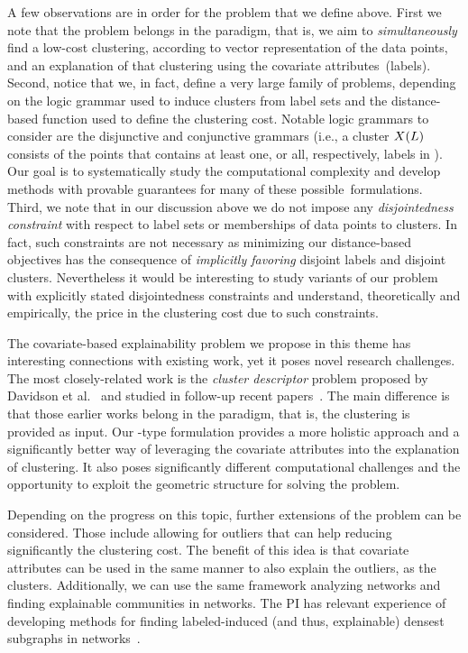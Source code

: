 \documentclass[a4paper,11pt]{article}
\begin{document}
A few observations are in order for the problem that we define above.
First we note that the problem belongs in the \joint paradigm, 
that is, we aim to \emph{simultaneously} find a low-cost clustering, 
according to vector representation of the data points,
and an explanation of that clustering using the covariate attributes~(labels).
%
Second, notice that we, in fact, define a very large family of problems, 
depending on the logic grammar used to induce clusters from label sets
and the distance-based function used to define the clustering cost.
Notable logic grammars to consider are the disjunctive and conjunctive grammars 
(i.e., a cluster $X({L})$ consists of the points 
that contains at least one, or all, respectively, labels in ).
Our goal is to systematically study the computational complexity and 
develop methods with provable guarantees
for many of these possible~formulations.
%
Third, we note that in our discussion above we do not impose any
\emph{disjointedness constraint} with respect to label sets or 
memberships of data points to clusters. 
In fact, such constraints are not necessary as minimizing 
our distance-based objectives has the consequence of \emph{implicitly favoring}
disjoint labels and disjoint clusters.
Nevertheless it would be interesting to study variants
of our problem with explicitly stated disjointedness constraints
and understand, theoretically and empirically, 
the price in the clustering cost due to such constraints.

The covariate-based explainability problem we propose in this theme
has interesting connections with existing work, yet it poses novel research challenges.
The most closely-related work is the \emph{cluster descriptor} problem
proposed by Davidson et al.~\cite{davidson2018cluster} 
and studied in follow-up recent papers~\citep{sambaturu2020efficient}.
The main difference is that those earlier works belong in the \posthoc paradigm, 
that is, the clustering is provided as input. 
Our \joint-type formulation provides a more holistic approach and a
significantly better way of leveraging the covariate attributes into the explanation of clustering. 
It also poses significantly different computational challenges
and the opportunity to exploit the geometric structure for solving the problem.

Depending on the progress on this topic, further extensions of the problem can be considered. 
Those include allowing for outliers that can help reducing significantly the clustering cost.
The benefit of this idea is that covariate attributes can be used in the same manner
to also explain the outliers, as the clusters.
Additionally, we can use the same framework analyzing networks and finding 
explainable communities in networks.
The PI has relevant experience of developing methods for finding labeled-induced
(and thus, explainable) densest subgraphs in networks~\cite{galbrun2014overlapping,galbrun2016top}.
\end{document}
